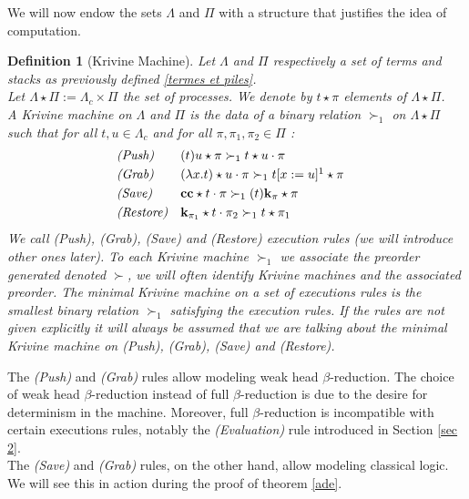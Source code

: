 \documentclass[a4paper,12pt]{article}
\newtheorem{defi}[theo]{Definition}
\theoremstyle{rmqstyle}
\newcommand{\cc}{\mathbf{cc}}
\renewcommand{\k}{\mathbf{k}}
\begin{document}
We will now endow the sets $\Lambda$ and $\Pi$ with a structure that justifies the idea of computation.

\begin{defi}[Krivine Machine]
Let $\Lambda$ and $\Pi$ respectively a set of terms and stacks as previously defined  \ref{termes et piles}.\\
Let $\Lambda \star \Pi := \Lambda_c \times \Pi$ the set of processes. We denote by  $t \star \pi$ elements of  $\Lambda \star \Pi$.\\
A Krivine machine on $\Lambda$ and $\Pi$ is the data of a binary relation $\succ_1$ on $\Lambda \star \Pi$ such that for all $t,u \in \Lambda_c$ and for all $\pi, \pi_1, \pi_2 \in \Pi$ : 
\begin{align*}
&\textit{(Push)}& &(t)u \star \pi \succ_1 t \star u \cdot \pi&\\
&\textit{(Grab)}& &(\lambda x. t) \star u \cdot \pi \succ_1 t[x := u]\footnotemark \star \pi&\\
&\textit{(Save)}& &\cc \star t \cdot \pi \succ_1 (t) \k_\pi \star \pi&\\
&\textit{(Restore)}& &\k_{\pi_1} \star t \cdot \pi_2 \succ_1 t \star \pi_1&
\end{align*}
We call \textit{(Push)}, \textit{(Grab)}, \textit{(Save)} and \textit{(Restore)} execution rules (we will introduce other ones later). To each Krivine machine $\succ_1$ we associate the preorder generated denoted $\succ$, we will often identify Krivine machines and the associated preorder. The minimal Krivine machine on a set of executions rules is the smallest binary relation $\succ_1$ satisfying the execution rules. If the rules are not given explicitly it will always be assumed that we are talking about the minimal Krivine machine on \textit{(Push)}, \textit{(Grab)}, \textit{(Save)} and \textit{(Restore)}.
\end{defi}

The \textit{(Push)} and \textit{(Grab)} rules allow modeling weak head $\beta$-reduction. The choice of weak head $\beta$-reduction instead of full $\beta$-reduction is due to the desire for determinism in the machine. Moreover, full $\beta$-reduction is incompatible with certain executions rules, notably the \textit{(Evaluation)} rule introduced in Section \ref{sec 2}.\\
The \textit{(Save)} and \textit{(Grab)} rules, on the other hand, allow modeling classical logic. We will see this in action during the proof of theorem \ref{ade}.
\end{document}
